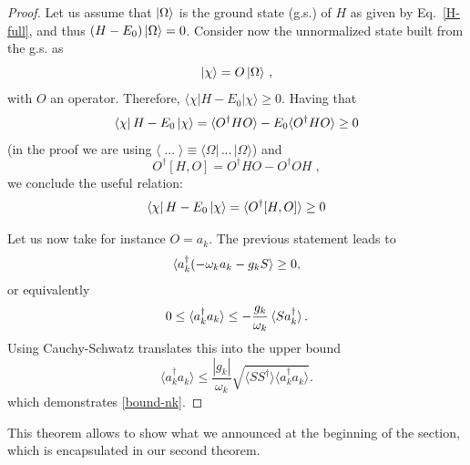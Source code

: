 \documentclass[notitlepage, prx, preprint, amsmath,superscriptaddress,amssymb]{revtex4-1}
\begin{document}
\begin{proof}
Let us assume that $\ket{\Omega}$ is the ground state (g.s.) of $H$ as given by Eq.\ \eqref{H-full}, and thus $(H-E_0)\ket{\Omega} = 0$.   Consider now the unnormalized state built from the g.s. as 
\begin{equation}
| \chi \rangle = O \ket{\Omega} \, ,
\end{equation}
with $O$ an operator.  Therefore, $\langle \chi | H - E_0 | \chi \rangle \geq 0$.   Having that
\begin{align}
\bra{\chi} H -E_0 \ket{\chi}  
= \langle O ^\dagger H O  \rangle  - E_0 
\langle  O ^\dagger H O  \rangle \geq 0 
\end{align}
(in the proof we are using $\langle \; ... \; \rangle \equiv \langle \Omega | \, ... \, | \Omega \rangle$)
and 
\begin{equation}
O^\dagger [H, O] = O^\dagger H O - O^\dagger O H \; ,
\end{equation}
we conclude the useful relation:
\begin{equation}
\bra{\chi} H -E_0 \ket{\chi}  
= \langle   O ^\dagger [H, O]  \rangle  \geq 0
\end{equation}


Let us now take for instance $O=a_k$. The previous statement leads to
\begin{align}
\braket{a_k^{\dagger} (-\omega_k a_k - g_k S }\geq 0,
\end{align}
or equivalently
\begin{equation}
0 \leq \braket{a_k^{\dagger}a_k} \leq -\frac{g_k}{\omega_k}\braket{ S a_k^{\dagger} }.
\end{equation}
Using Cauchy-Schwatz translates this into the upper bound
\begin{equation}
\langle a_k^\dagger a_k \rangle \leq \frac{|g_k|}{\omega_k} \sqrt{ \langle S S^\dagger \rangle \langle a_k^\dagger a_k \rangle}.
\end{equation}
which demonstrates \eqref{bound-nk}.
\end{proof}



This theorem allows to show what we announced at the beginning of the section, which is encapsulated in our second theorem.
\end{document}
